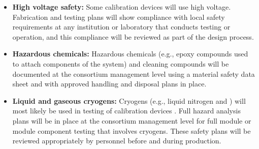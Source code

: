 \begin{itemize}

\item {\bf High voltage safety:} Some calibration devices will use high voltage. Fabrication and testing plans will show compliance with local  safety requirements at any institution or laboratory that conducts testing or operation, and this compliance will be reviewed as part of the design process.

\item {\bf Hazardous chemicals:} Hazardous chemicals (e.g., epoxy compounds used to attach components of the system) and cleaning compounds will be documented at the consortium management level using a material safety data sheet and with approved handling and disposal plans in place.

\item {\bf Liquid and gaseous cryogens:} Cryogens (e.g., liquid nitrogen and ) will most likely be used in testing  of calibration devices . Full hazard analysis plans will be in place at the consortium management level for full module or module component testing that involves cryogens. These safety plans will be reviewed appropriately by   personnel before and during production.

\end{itemize}



